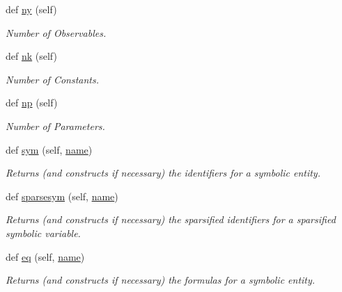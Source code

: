\begin{DoxyCompactItemize}
def \mbox{\hyperlink{classamici_1_1ode__export_1_1_o_d_e_model_ac3d9b681827ebea0e5bee18c9d7fc44d}{ny}} (self)
\begin{DoxyCompactList}\small\item\em Number of Observables. \end{DoxyCompactList}\item 
def \mbox{\hyperlink{classamici_1_1ode__export_1_1_o_d_e_model_a07767f24c77537a68972e99a79ef93aa}{nk}} (self)
\begin{DoxyCompactList}\small\item\em Number of Constants. \end{DoxyCompactList}\item 
def \mbox{\hyperlink{classamici_1_1ode__export_1_1_o_d_e_model_a7278a09e012ba867faf10d809e13fb81}{np}} (self)
\begin{DoxyCompactList}\small\item\em Number of Parameters. \end{DoxyCompactList}\item 
def \mbox{\hyperlink{classamici_1_1ode__export_1_1_o_d_e_model_a47906a8f4c249a513f4d6ca7c12d2304}{sym}} (self, \mbox{\hyperlink{classamici_1_1ode__export_1_1_o_d_e_model_a4d110acf8e52c4d48044071ea06952c0}{name}})
\begin{DoxyCompactList}\small\item\em Returns (and constructs if necessary) the identifiers for a symbolic entity. \end{DoxyCompactList}\item 
def \mbox{\hyperlink{classamici_1_1ode__export_1_1_o_d_e_model_a0a1d830b8c4d1e208e81f48dfea71cf4}{sparsesym}} (self, \mbox{\hyperlink{classamici_1_1ode__export_1_1_o_d_e_model_a4d110acf8e52c4d48044071ea06952c0}{name}})
\begin{DoxyCompactList}\small\item\em Returns (and constructs if necessary) the sparsified identifiers for a sparsified symbolic variable. \end{DoxyCompactList}\item 
def \mbox{\hyperlink{classamici_1_1ode__export_1_1_o_d_e_model_addafc9d839b53dbe76461d8ac6dba604}{eq}} (self, \mbox{\hyperlink{classamici_1_1ode__export_1_1_o_d_e_model_a4d110acf8e52c4d48044071ea06952c0}{name}})
\begin{DoxyCompactList}\small\item\em Returns (and constructs if necessary) the formulas for a symbolic entity. \end{DoxyCompactList}\item 

\end{DoxyCompactItemize}

